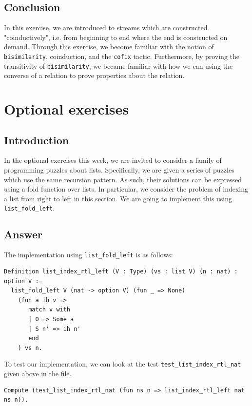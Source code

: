 \documentclass{article}
\begin{document}
\subsection{Conclusion}

In this exercise, we are introduced to streams which are constructed "coinductively", i.e. from beginning to end where the end is constructed on demand. Through this exercise, we become familiar with the notion of \texttt{bisimilarity}, coinduction, and the \texttt{cofix} tactic. Furthermore, by proving the transitivity of \texttt{bisimilarity}, we became familiar with how we can using the converse of a relation to prove properties about the relation.

\newpage

\section{Optional exercises}

\subsection{Introduction}
In the optional exercises this week, we are invited to consider a family of programming puzzles about lists. Specifically, we are given a series of puzzles which use the same recursion pattern. As such, their solutions can be expressed using a fold function over lists. In particular, we consider the problem of indexing a list from right to left in this section. We are going to implement this using \texttt{list\_fold\_left}.

\subsection{Answer}
The implementation using \texttt{list\_fold\_left} is as follows: 

\begin{lstlisting}
Definition list_index_rtl_left (V : Type) (vs : list V) (n : nat) : option V :=
  list_fold_left V (nat -> option V) (fun _ => None)
    (fun a ih v =>
       match v with
       | O => Some a
       | S n' => ih n'
       end
    ) vs n.
\end{lstlisting}

To test our implementation, we can look at the test \texttt{test\_list\_index\_rtl\_nat} given above in the file. 

\begin{lstlisting}
Compute (test_list_index_rtl_nat (fun ns n => list_index_rtl_left nat ns n)).
\end{lstlisting}
\end{document}
